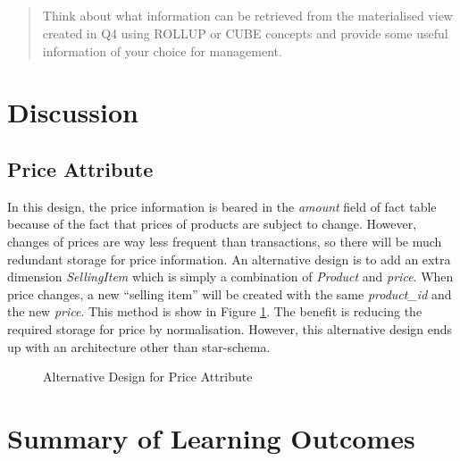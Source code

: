\documentclass[
  a4paper,
]{article}
\begin{document}
\hypertarget{section-4}{%
\subsection{}\label{section-4}}

\begin{quote}
Think about what information can be retrieved from the materialised view
created in Q4 using ROLLUP or CUBE concepts and provide some useful
information of your choice for management.
\end{quote}

\renewcommand*{\thesubsection}{\oldsubsection}

\hypertarget{discussion}{%
\section{Discussion}\label{discussion}}

\hypertarget{price-attribute}{%
\subsection{Price Attribute}\label{price-attribute}}

In this design, the price information is beared in the \emph{amount}
field of fact table because of the fact that prices of products are
subject to change. However, changes of prices are way less frequent than
transactions, so there will be much redundant storage for price
information. An alternative design is to add an extra dimension
\emph{SellingItem} which is simply a combination of \emph{Product} and
\emph{price}. When price changes, a new ``selling item'' will be created
with the same \emph{product\_id} and the new \emph{price}. This method
is show in Figure \ref{fig:alter-price}. The benefit is reducing the
required storage for price by normalisation. However, this alternative
design ends up with an architecture other than star-schema.

\begin{figure}[htbp]
  \centering
  { %
  \fontsize{9}{10}\selectfont
    \resizebox{0.9\textwidth}{!}{}
  }
  \caption{Alternative Design for Price Attribute}
  \label{fig:alter-price}
\end{figure}

\hypertarget{summary-of-learning-outcomes}{%
\section{Summary of Learning
Outcomes}\label{summary-of-learning-outcomes}}
\end{document}
